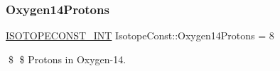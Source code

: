 \subsubsection{\texorpdfstring{Oxygen14\+Protons}{Oxygen14Protons}}
{\footnotesize\ttfamily \mbox{\hyperlink{group___isotope_const-_macros_ga5f18360b3e99483a35c32d789e62621c}{I\+S\+O\+T\+O\+P\+E\+C\+O\+N\+S\+T\+\_\+\+I\+NT}} Isotope\+Const\+::\+Oxygen14\+Protons = 8}

\$ \$ Protons in Oxygen-\/14. 